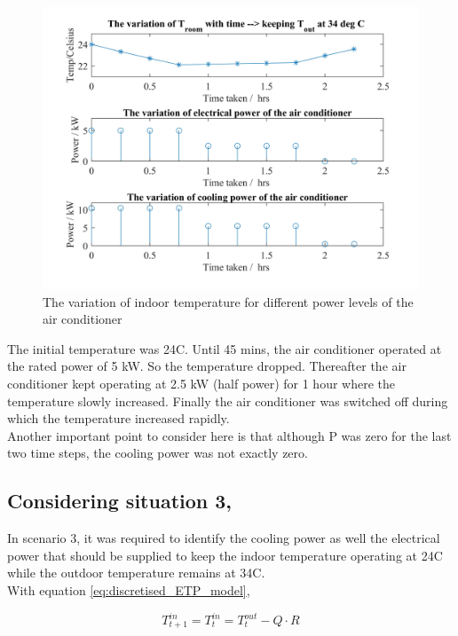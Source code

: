 \documentclass[12pt,a4paper]{article}
\begin{document}
\begin{figure}[h!]
    \centering
    \includegraphics[width=13cm]{images/for_varying_power_levels_with_Q.jpg}
    \caption{The variation of indoor temperature for different power levels of the air conditioner}
    \label{fig:my_label}
\end{figure}

The initial temperature was 24\degree C. Until 45 mins, the air conditioner operated at the rated power of 5 kW. So the temperature dropped. Thereafter the air conditioner kept operating at 2.5 kW (half power) for 1 hour where the temperature slowly increased. Finally the air conditioner was switched off during which the temperature increased rapidly.\\

Another important point to consider here is that although P was zero for the last two time steps, the cooling power was not exactly zero.\\


\subsection*{Considering situation 3,}

In scenario 3, it was required to identify the cooling power as well the electrical power that should be supplied to keep the indoor temperature operating at 24\degree C while the outdoor temperature remains at 34\degree C.\\

With equation \eqref{eq:discretised_ETP_model},

\begin{equation}
    T_{t+1}^{in} = T_{t}^{in} = T_{t}^{out} - Q\cdot R
\end{equation}
\end{document}
